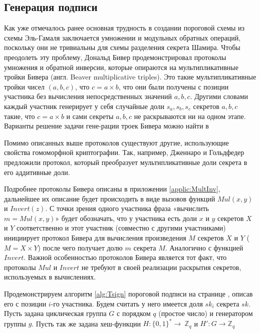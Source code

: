 \documentclass[a4paper,12pt]{article}
\theoremstyle{definition}
\begin{document}
		
		\subsection{Генерация подписи}
		
		Как уже отмечалось ранее основная трудность в создании пороговой схемы из схемы Эль-Гамаля заключается умножении и модульных обратных операций, поскольку они не тривиальны для схемы разделения секрета Шамира. Чтобы преодолеть эту проблему, Дональд Бивер продемонстрировал \cite{paper4,paper5} протоколы умножения и обратной инверсии, которые опираются на мультипликативные тройки Бивера (англ. Beaver multiplicative triples). Это такие мультипликативные тройки чисел $(a, b, c)$, что $c=a\times b$, что они были получены с позиции участника без вычисления непосредственных значений $a, b, c$. Другими словами каждый участник генерирует у себя случайные доли $s_a, s_b, s_c$ секретов $a, b, c$ такие, что $c=a\times b$ и сами секреты $a, b, c$ не раскрываются ни на одном этапе. Варианты решение задачи гене-рации троек Бивера можно найти в \cite{paper6}
		
		Помимо описанных выше протоколов существуют другие, использующие свойства гомоморфной криптографии. Так, например, Дженнаро и Гольдфедер предложили \cite{paper7} протокол, который преобразует мультипликативные доли секрета в его аддитивные доли.
		
		Подробнее протоколы Бивера описаны в приложении \ref{applic:MultInv}, дальнейшее их описание будет происходить в виде вызовов функций $Mul(x, y)$ и $Invert(z)$. С точки зрения одного участника фраза «вычислить $m=Mul(x, y)$» будет обозначать, что у участника есть доли $x$ и $y$ секретов $X$ и $Y$ соответственно и этот участник (совместно с другими участниками) инициирует протокол Бивера для вычисления произведения $M$ секретов $X$ и $Y$ ($M=X\times Y$) после чего получает долю $m$ секрета $M$. Аналогично с функцией $Invert$. Важной особенностью протоколов Бивера является тот факт, что протоколы $Mul$ и $Invert$ не требуют в своей реализации раскрытия секретов, используемых в вычислениях.
		
		Продемонстрируем алгоритм \ref{alg:Tsign} пороговой подписи на странице \pageref{alg:Tsign}, описав его с позиции $i$-го участника. Будем считать у него имеется доля $sk_i$ секрета $sk$. Пусть задана циклическая группа $G$ с порядком $q$ (простое число) и генератором группы $g$. Пусть так же задана хеш-функции $H: \{0,1\}^* \rightarrow~\mathbb{Z}_q$ и $H': G \rightarrow \mathbb{Z}_q$
				
\end{document}
